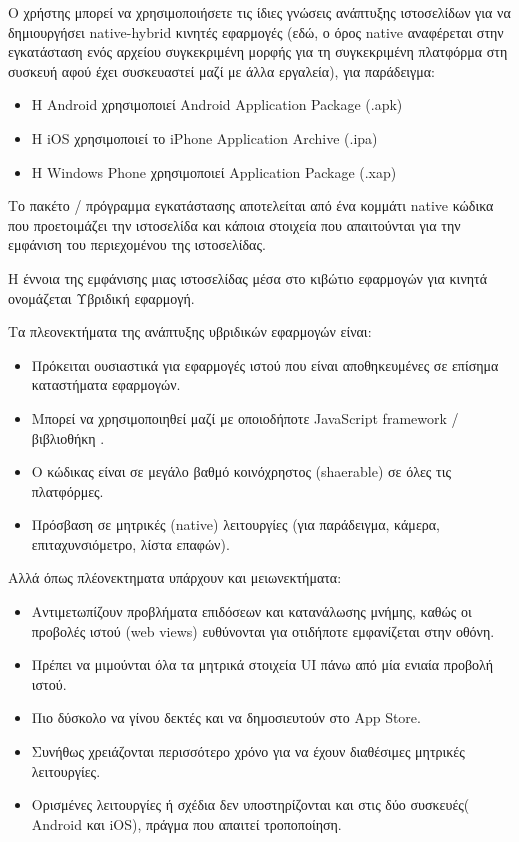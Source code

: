 \documentclass[a4paper,12pt]{article}
\begin{document}
			Ο χρήστης μπορεί να χρησιμοποιήσετε τις ίδιες γνώσεις ανάπτυξης ιστοσελίδων για να δημιουργήσει native-hybrid κινητές εφαρμογές (εδώ, ο όρος native 
			αναφέρεται στην εγκατάσταση ενός αρχείου συγκεκριμένη μορφής για τη συγκεκριμένη πλατφόρμα στη συσκευή αφού έχει συσκευαστεί μαζί με άλλα εργαλεία), για παράδειγμα:
			\begin{itemize}

				\item Η Android χρησιμοποιεί Android Application Package (.apk)				
				\item Η iOS χρησιμοποιεί το iPhone Application Archive (.ipa)
				\item Η Windows Phone χρησιμοποιεί Application Package (.xap)
				
			\end{itemize}
			Το πακέτο / πρόγραμμα εγκατάστασης αποτελείται από ένα κομμάτι native κώδικα που προετοιμάζει την ιστοσελίδα
			και κάποια στοιχεία που απαιτούνται για την εμφάνιση του περιεχομένου της ιστοσελίδας.

			Η έννοια της εμφάνισης μιας ιστοσελίδας μέσα στο κιβώτιο εφαρμογών για κινητά ονομάζεται Υβριδική εφαρμογή.

			Τα πλεονεκτήματα της ανάπτυξης υβριδικών εφαρμογών είναι:
		
			\begin{itemize}
				\item Πρόκειται ουσιαστικά για εφαρμογές ιστού που είναι αποθηκευμένες σε επίσημα καταστήματα εφαρμογών.
			
				\item Μπορεί να χρησιμοποιηθεί μαζί με οποιοδήποτε JavaScript framework / βιβλιοθήκη .
				
				\item Ο κώδικας είναι σε μεγάλο βαθμό κοινόχρηστος (shaerable) σε όλες τις πλατφόρμες.
				
				\item Πρόσβαση σε μητρικές (native) λειτουργίες (για παράδειγμα, κάμερα, επιταχυνσιόμετρο, λίστα επαφών).
			\end{itemize}
			
			Αλλά όπως πλέονεκτηματα υπάρχουν και μειωνεκτήματα:
			
			\begin{itemize}
				\item Αντιμετωπίζουν προβλήματα επιδόσεων και κατανάλωσης μνήμης, καθώς οι προβολές ιστού (web views) ευθύνονται για οτιδήποτε εμφανίζεται στην οθόνη.
				
				\item Πρέπει να μιμούνται όλα τα μητρικά στοιχεία UI πάνω από μία ενιαία προβολή ιστού.
				
				\item Πιο δύσκολο να γίνου δεκτές και να δημοσιευτούν στο App Store.
				
				\item Συνήθως χρειάζονται περισσότερο χρόνο για να έχουν διαθέσιμες μητρικές λειτουργίες.
				
				\item Ορισμένες λειτουργίες ή σχέδια δεν υποστηρίζονται και στις δύο συσκευές( Android και iOS), πράγμα που απαιτεί τροποποίηση.
			
			\end{itemize}
\end{document}
